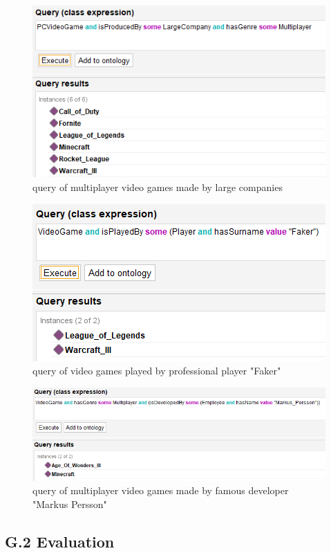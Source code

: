 \documentclass{article}
\begin{document}
\begin{figure}[h]
\centering
  \includegraphics[scale=0.6]{query1}
  \caption{query of multiplayer video games made by large companies}
\end{figure}
\begin{figure}[h]
  \centering
  \includegraphics[scale=0.5]{query2}
   \caption{query of video games played by professional player "Faker"}
\end{figure}
\begin{figure}[h!]  
\centering
  \includegraphics[scale=0.5]{query3}
   \caption{query of multiplayer video games made by famous developer "Markus Persson"}
\end{figure}

\subsection*{G.2 Evaluation}
\end{document}
